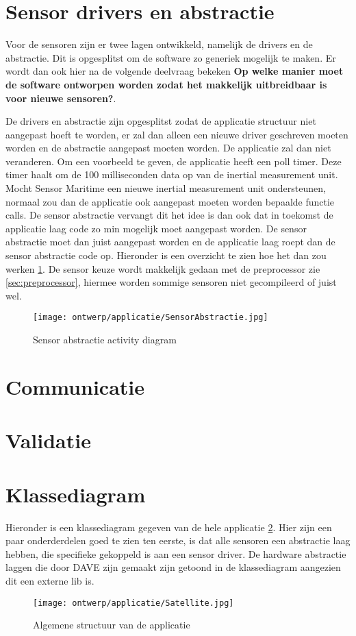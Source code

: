 \section{Sensor drivers en abstractie}
Voor de sensoren zijn er twee lagen ontwikkeld, namelijk de drivers en de abstractie. Dit is opgesplitst om de software zo generiek mogelijk te maken. Er wordt dan ook hier na de volgende deelvraag bekeken \textbf{Op welke manier moet de software ontworpen worden zodat het makkelijk uitbreidbaar is voor nieuwe sensoren?}. \newline 

\noindent De drivers en abstractie zijn opgesplitst zodat de applicatie structuur niet aangepast hoeft te worden, er zal dan alleen een nieuwe driver geschreven moeten worden en de abstractie aangepast moeten worden. De applicatie zal dan niet veranderen. Om een voorbeeld te geven, de applicatie heeft een poll timer. Deze timer haalt om de 100 milliseconden data op van de inertial measurement unit. Mocht Sensor Maritime een nieuwe inertial measurement unit ondersteunen, normaal zou dan de applicatie ook aangepast moeten worden bepaalde functie calls. De sensor abstractie vervangt dit het idee is dan ook dat in toekomst de applicatie laag code zo min mogelijk moet aangepast worden. De sensor abstractie moet dan juist aangepast worden en de applicatie laag roept dan de sensor abstractie code op. Hieronder is een overzicht te zien hoe het dan zou werken \ref{fig:SensorAbstractie}. De sensor keuze wordt makkelijk gedaan met de preprocessor zie \ref{sec:preprocessor}, hiermee worden sommige sensoren niet gecompileerd of juist wel.
\begin{figure}[h!]
	\centering
	\label{fig:SensorAbstractie}
	\caption{Sensor abstractie activity diagram}
	\texttt{[image: ontwerp/applicatie/SensorAbstractie.jpg]}
\end{figure}
	
	
\newpage
\section{Communicatie}

\newpage

\newpage
\section{Validatie}


\newpage
\section{Klassediagram}
Hieronder is een klassediagram gegeven van de hele applicatie \ref{fig:klassediagram}. Hier zijn een paar onderderdelen goed te zien ten eerste, is dat alle sensoren een abstractie laag hebben, die specifieke gekoppeld is aan een sensor  driver. De hardware abstractie laggen die door DAVE zijn gemaakt zijn getoond in de klassediagram aangezien dit een externe lib is.
\begin{figure}[h!]
	\centering
	\label{fig:klassediagram}
	\caption{Algemene structuur van de applicatie}
	\texttt{[image: ontwerp/applicatie/Satellite.jpg]}
\end{figure}

